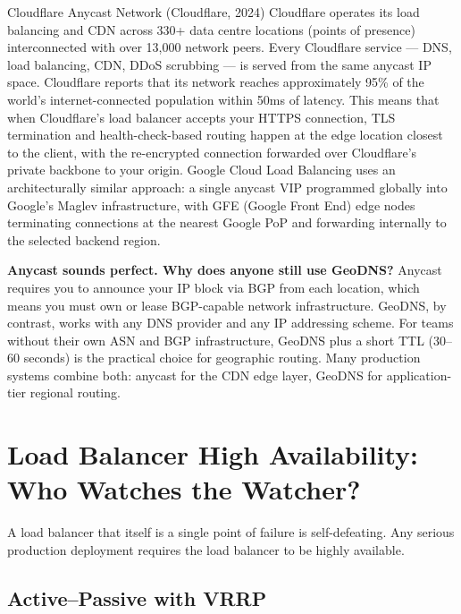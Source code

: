 \documentclass[11pt,a4paper]{article}
\begin{document}
\begin{industrybox}{Cloudflare Anycast Network (Cloudflare, 2024)}
  Cloudflare operates its load balancing and CDN across 330+ data centre locations (points of
  presence) interconnected with over 13,000 network peers. Every Cloudflare service --- DNS, load
  balancing, CDN, DDoS scrubbing --- is served from the same anycast IP space. Cloudflare reports
  that its network reaches approximately 95\% of the world's internet-connected population within
  50ms of latency. This means that when Cloudflare's load balancer accepts your HTTPS connection,
  TLS termination and health-check-based routing happen at the edge location closest to the client,
  with the re-encrypted connection forwarded over Cloudflare's private backbone to your origin.
  Google Cloud Load Balancing uses an architecturally similar approach: a single anycast VIP
  programmed globally into Google's Maglev infrastructure, with GFE (Google Front End) edge nodes
  terminating connections at the nearest Google PoP and forwarding internally to the selected
  backend region.
\end{industrybox}

\begin{thinkbox}
  \textbf{Anycast sounds perfect. Why does anyone still use GeoDNS?} Anycast requires you to
  announce your IP block via BGP from each location, which means you must own or lease BGP-capable
  network infrastructure. GeoDNS, by contrast, works with any DNS provider and any IP addressing
  scheme. For teams without their own ASN and BGP infrastructure, GeoDNS plus a short TTL (30--60
  seconds) is the practical choice for geographic routing. Many production systems combine both:
  anycast for the CDN edge layer, GeoDNS for application-tier regional routing.
\end{thinkbox}

\section{Load Balancer High Availability: Who Watches the Watcher?}

A load balancer that itself is a single point of failure is self-defeating. Any serious production
deployment requires the load balancer to be highly available.

\subsection{Active--Passive with VRRP}
\end{document}
